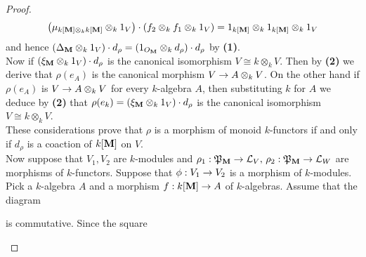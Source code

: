 \begin{proof}
$$\left(\mu_{k[\mathbf{M}]\otimes_kk[\mathbf{M}]}\otimes_k1_V\right)\cdot \left(f_2\otimes_kf_1\otimes_k1_V\right) = 1_{k[\mathbf{M}]}\otimes_k1_{k[\mathbf{M}]}\otimes_k1_V$$
and hence $\left(\Delta_{\mathbf{M}}\otimes_{k}1_V\right)\cdot d_{\rho}=\left(1_{O_{\mathbf{M}}}\otimes_{k}d_{\rho}\right)\cdot d_{\rho}$ by \textbf{(1)}.\\
Now if $\left(\xi_{\mathbf{M}}\otimes_k 1_V\right) \cdot d_{\rho}$ is the canonical isomorphism $V\cong k\otimes_kV$. Then by \textbf{(2)} we derive that $\rho(e_A)$ is the canonical morphism $V \rightarrow A\otimes_kV$. On the other hand if $\rho(e_A)$ is $V \rightarrow A\otimes_kV$ for every $k$-algebra $A$, then substituting $k$ for $A$ we deduce by \textbf{(2)} that $\rho(e_k) = \left(\xi_{\mathbf{M}}\otimes_k 1_V\right) \cdot d_{\rho}$ is the canonical isomorphism $V\cong k\otimes_kV$.\\
These considerations prove that $\rho$ is a morphism of monoid $k$-functors if and only if $d_{\rho}$ is a coaction of $k[\mathbf{M}]$ on $V$.\\
Now suppose that $V_1,V_2$ are $k$-modules and $\rho_1:{\mathfrak P}_{\mathbf{M}}\rightarrow {\mathcal L}_V,\,\rho_2:{\mathfrak P}_{\mathbf{M}}\rightarrow {\mathcal L}_W$ are morphisms of $k$-functors. Suppose that $\phi:V_1\rightarrow V_2$ is a morphism of $k$-modules. Pick a $k$-algebra $A$ and a morphism $f:k[\mathbf{M}]\rightarrow A$ of $k$-algebras. Assume that the diagram
\begin{center}
\end{center}
is commutative. Since the square
\begin{center}
\end{center}
\end{proof}
